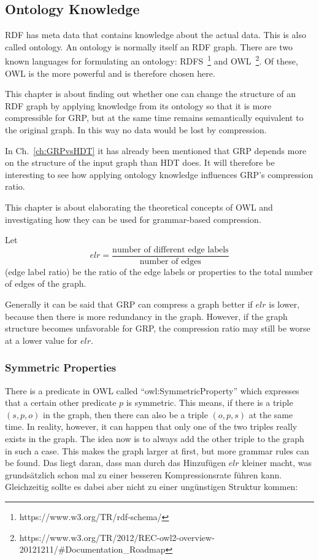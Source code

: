 \subsection{Ontology Knowledge}\label{sec:approachOntKnowledge}

RDF has meta data that contains knowledge about the actual data. This is also called ontology. An ontology is normally itself an RDF graph. There are two known languages for formulating an ontology: RDFS~\footnote{\label{foot:3}https://www.w3.org/TR/rdf-schema/} and OWL~\footnote{\label{foot:4}https://www.w3.org/TR/2012/REC-owl2-overview-20121211/\#Documentation\_Roadmap}. Of these, OWL is the more powerful and is therefore chosen here.

This chapter is about finding out whether one can change the structure of an RDF graph by applying knowledge from its ontology so that it is more compressible for GRP, but at the same time remains semantically equivalent to the original graph. In this way no data would be lost by compression.

In Ch.~\ref{ch:GRPvsHDT}  it has already been mentioned that GRP depends more on the structure of the input graph than HDT does. It will therefore be interesting to see how applying ontology knowledge influences GRP's compression ratio.

This chapter is about elaborating the theoretical concepts of OWL and investigating how they can be used for grammar-based compression.

Let \[ elr = \dfrac{\text{number of different edge labels}}{\text{number of edges}} \] (edge label ratio) be the ratio of the edge labels or properties to the total number of edges of the graph. 

Generally it can be said that GRP can compress a graph better if $elr$ is lower, because then there is more redundancy in the graph. However, if the graph structure becomes unfavorable for GRP, the compression ratio may still be worse at a lower value for $elr$.


\subsubsection{Symmetric Properties}

There is a predicate in OWL called \enquote{owl:SymmetricProperty} which expresses that a certain other predicate $p$ is symmetric. This means, if there is a triple $(s,p,o)$ in the graph, then there can also be a triple $(o,p,s)$ at the same time. In reality, however, it can happen that only one of the two triples really exists in the graph. The idea now is to always add the other triple to the graph in such a case. This makes the graph larger at first, but more grammar rules can be found. Das liegt daran, dass man durch das Hinzufügen $elr$ kleiner macht, was grundsätzlich schon mal zu einer besseren Kompressionsrate führen kann. Gleichzeitig sollte es dabei aber nicht zu einer ungünstigen Struktur kommen:

